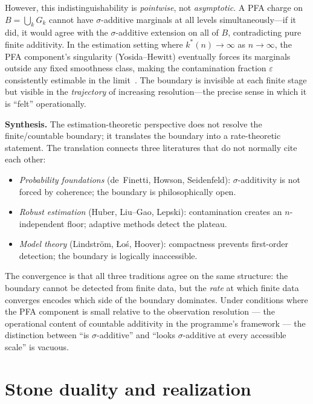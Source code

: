 However, this indistinguishability is \emph{pointwise}, not
\emph{asymptotic}.  A PFA charge on $B = \bigcup_k G_k$ cannot have
$\sigma$-additive marginals at all levels simultaneously---if it
did, it would agree with the $\sigma$-additive extension on all of $B$,
contradicting pure finite additivity.  In the estimation setting
where $k^*(n) \to \infty$ as $n \to \infty$, the PFA component's
singularity (Yosida--Hewitt) eventually forces its marginals outside
any fixed smoothness class, making the contamination fraction
$\varepsilon$ consistently estimable in the limit~\cite{PatraSen2016, ChenGaoRen2016}.  The boundary is invisible
at each finite stage but visible in the \emph{trajectory} of
increasing resolution---the precise sense in which it is ``felt''
operationally.

\medskip\noindent
\textbf{Synthesis.}  The estimation-theoretic perspective does not
resolve the finite/countable boundary; it translates the boundary
into a rate-theoretic statement.  The translation connects three
literatures that do not normally cite each other:
\begin{itemize}[nosep]
  \item \emph{Probability foundations} (de~Finetti, Howson,
    Seidenfeld): $\sigma$-additivity is not forced by coherence;
    the boundary is philosophically open.
  \item \emph{Robust estimation} (Huber, Liu--Gao, Lepski):
    contamination creates an $n$-independent floor; adaptive methods
    detect the plateau.
  \item \emph{Model theory} (Lindstr\"{o}m, \L{}o\'{s}, Hoover):
    compactness prevents first-order detection; the boundary is
    logically inaccessible.
\end{itemize}
The convergence is that all three traditions agree on the same
structure: the boundary cannot be detected from finite data, but the
\emph{rate} at which finite data converges encodes which side of the
boundary dominates.  Under conditions where the PFA component is
small relative to the observation resolution --- the operational
content of countable additivity in the programme's framework --- the
distinction between ``is $\sigma$-additive'' and ``looks
$\sigma$-additive at every accessible scale'' is vacuous.

\section{Stone duality and realization}
\label{sec:realization}

